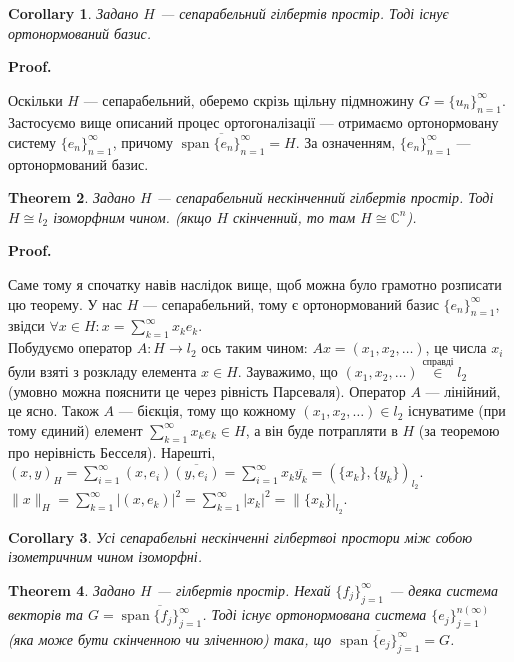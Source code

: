\documentclass[a4paper, 10pt]{article}
\makeatletter
\theoremstyle{theoremdd}
\newtheorem{theorem}{Theorem}[subsection]
\theoremstyle{theoremdd}
\theoremstyle{theoremdd}
\theoremstyle{theoremdd}
\theoremstyle{theoremdd}
\theoremstyle{theoremdd}
\theoremstyle{theoremdd}
\theoremstyle{theoremdd}
\newtheorem{corollary}[theorem]{Corollary}
\renewenvironment{proof}[1][Proof.\\]{\par
\pushQED{\hfill \qed}%
\normalfont \topsep6\p@\@plus6\p@\relax
\trivlist
\item\relax
{\bfseries
#1\@addpunct{.}}\hspace\labelsep\ignorespaces
}{%
\popQED\endtrivlist\@endpefalse
}
\DeclareMathOperator{\linspan}{span}
\makeatother
\begin{document}
\begin{corollary}
Задано $H$ --- сепарабельний гілбертів простір. Тоді існує ортонормований базис.
\end{corollary}

\begin{proof}
Оскільки $H$ --- сепарабельний, оберемо скрізь щільну підмножину $G = \{u_n\}_{n=1}^\infty$. Застосуємо вище описаний процес ортогоналізації --- отримаємо ортонормовану систему $\{e_n\}_{n=1}^\infty$, причому $\overline{\linspan\{e_n\}_{n=1}^\infty} = H$. За означенням, $\{e_n\}_{n=1}^\infty$ --- ортонормований базис.
\end{proof}

\begin{theorem}
Задано $H$ --- сепарабельний нескінченний гілбертів простір. Тоді $H \cong l_2$ ізоморфним чином. (якщо $H$ скінченний, то там $H \cong \mathbb{C}^n$).
\end{theorem}

\begin{proof}
Саме тому я спочатку навів наслідок вище, щоб можна було грамотно розписати цю теорему. У нас $H$ --- сепарабельний, тому є ортонормований базис $\{e_n\}_{n=1}^\infty$, звідси $\forall x \in H: x = \displaystyle\sum_{k=1}^\infty x_k e_k$.\\
Побудуємо оператор $A \colon H \to l_2$ ось таким чином: $Ax = (x_1,x_2,\dots)$, це числа $x_i$ були взяті з розкладу елемента $x \in H$. Зауважимо, що $(x_1,x_2,\dots) \overset{\text{справді}}{\in} l_2$ (умовно можна пояснити це через рівність Парсеваля). Оператор $A$ --- лінійний, це ясно. Також $A$ --- бієкція, тому що кожному $(x_1,x_2,\dots) \in l_2$ існуватиме (при тому єдиний) елемент $\displaystyle\sum_{k=1}^\infty x_k e_k \in H$, а він буде потрапляти в $H$ (за теоремою про нерівність Бесселя). Нарешті,\\
$(x,y)_H = \displaystyle\sum_{i=1}^\infty (x,e_i) \overline{(y,e_i)} = \sum_{i=1}^\infty x_k \overline{y_k} = (\{x_k\},\{y_k\})_{l_2}$.\\
$\|x\|_H = \displaystyle\sum_{k=1}^\infty |(x,e_k)|^2 = \sum_{k=1}^\infty |x_k|^2 = \| \{x_k\}|_{l_2}$.
\end{proof}

\begin{corollary}
Усі сепарабельні нескінченні гілбертвоі простори між собою ізометричним чином ізоморфні.
\end{corollary}

\iffalse
\begin{theorem}
Задано $H$ --- гілбертів простір. Нехай $\{f_j\}_{j=1}^\infty$ --- деяка система векторів та $G = \overline{\linspan\{f_j\}_{j=1}^\infty}$. Тоді існує ортонормована система $\{e_j\}_{j=1}^{n (\infty)}$ (яка може бути скінченною чи зліченною) така, що $\overline{\linspan\{e_j\}_{j=1}^\infty} = G$.
\end{theorem}
\end{document}
